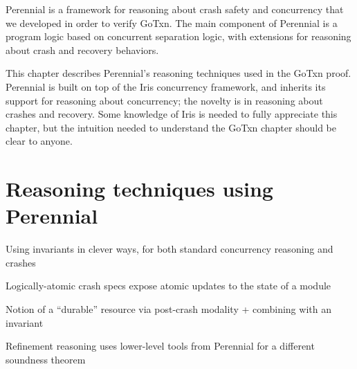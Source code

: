 Perennial is a framework for reasoning about crash safety and concurrency that
we developed in order to verify GoTxn. The main component of Perennial is a
program logic based on concurrent separation logic, with extensions for
reasoning about crash and recovery behaviors.

This chapter describes Perennial's reasoning techniques used in the GoTxn proof.
Perennial is built on top of the Iris concurrency framework, and inherits its
support for reasoning about concurrency; the novelty is in reasoning about
crashes and recovery. Some knowledge of Iris is needed to fully appreciate this
chapter, but the intuition needed to understand the GoTxn chapter should be
clear to anyone.




\section{Reasoning techniques using Perennial}

Using invariants in clever ways, for both standard concurrency reasoning and
crashes

Logically-atomic crash specs expose atomic updates to the state of a module

Notion of a ``durable'' resource via post-crash modality + combining with an
invariant

Refinement reasoning uses lower-level tools from Perennial for a different
soundness theorem
